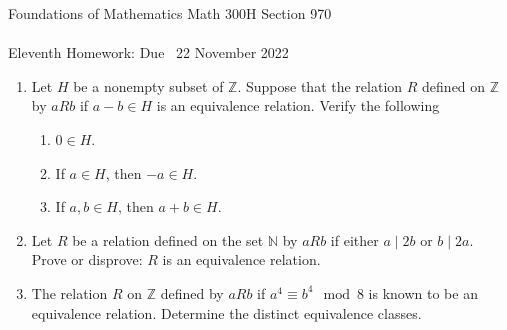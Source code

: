 \documentclass[12pt]{article}
\newcommand{\NN}{{\mathbb N}}  %
\newcommand{\ZZ}{{\mathbb Z}}  %
\begin{document}
\LARGE 
\noindent
{\color{Maroon}Foundations of Mathematics \hfill Math 300H Section 970}\vspace{2pt}\\
\Large \vspace{2pt}\\
\large
Eleventh Homework: \hfill Due \  22 November 2022
\normalsize\medskip


\noindent{\color{blue}\rule{528.3675pt}{2pt}}


\begin{enumerate}  %


\item  Let $H$ be a nonempty subset of $\ZZ$.
  Suppose that the relation $R$ defined on $\ZZ$ by $a R b$ if $a - b\in  H$ is an equivalence relation.
  Verify the following
  \begin{enumerate}
    \item $0\in H$.
    \item If $a\in H$, then $-a\in H$.
    \item If $a,b\in H$, then $a+b\in H$.
  \end{enumerate}


\item Let $R$ be a relation defined on the set $\NN$ by $a R b$ if either $a \mid 2b$ or $b \mid 2a$.
       Prove or disprove: $R$ is an equivalence relation.


 
  
\item The relation $R$ on $\ZZ$ defined by $a R b$ if $a^4 \equiv b^4 \mod 8$ is known to be an equivalence relation.
  Determine the distinct equivalence classes.


\end{enumerate}
\end{document}
